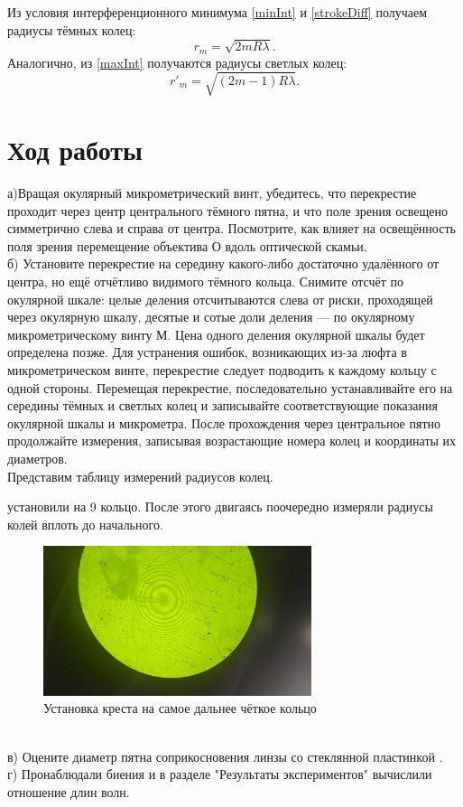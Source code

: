 \documentclass[a4paper,12pt]{article} %
\begin{document}
Из условия интерференционного минимума \eqref{minInt} и \eqref{strokeDiff} получаем радиусы тёмных колец:
\begin{equation}\label{DarthRadius}
    r_m = \sqrt{2mR\lambda}.
\end{equation}
Аналогично, из \eqref{maxInt} получаются радиусы светлых колец:
\begin{equation}
    r'_m = \sqrt{(2m-1)R\lambda}.
\end{equation}

\section{Ход работы}
а)Вращая окулярный микрометрический винт, убедитесь, что перекрестие проходит через центр центрального тёмного пятна, и что поле зрения освещено симметрично слева и справа от центра.
Посмотрите, как влияет на освещённость поля зрения перемещение объектива О вдоль оптической скамьи.\\
б) Установите перекрестие на середину какого-либо достаточно удалённого от центра, но ещё отчётливо видимого тёмного кольца.
Снимите отсчёт по окулярной шкале: целые деления отсчитываются слева от риски, проходящей через окулярную шкалу, десятые и сотые доли деления — по окулярному микрометрическому винту М. Цена одного деления окулярной шкалы будет определена позже.
Для устранения ошибок, возникающих из-за люфта в микрометрическом винте, перекрестие следует подводить к каждому кольцу с одной стороны.
Перемещая перекрестие, последовательно устанавливайте его на середины тёмных и светлых колец и записывайте соответствующие показания окулярной шкалы и микрометра. После прохождения через центральное пятно продолжайте измерения, записывая возрастающие номера колец и координаты их диаметров. \\
Представим таблицу измерений радиусов колец.

установили на 9 кольцо. После этого двигаясь поочередно измеряли радиусы колей вплоть до начального.
\begin{figure}[h]
    \centering
    \includegraphics[width=0.7\textwidth]{пункт_б.jpg}
    \caption{Установка креста на самое дальнее чёткое кольцо}
    \label{setup}
\end{figure}
\\
в) Оцените диаметр пятна соприкосновения линзы со стеклянной пластинкой .\\
г) Пронаблюдали биения и в разделе "Результаты экспериментов" вычислили отношение длин волн.
\end{document}

